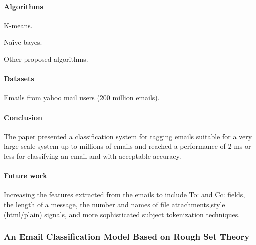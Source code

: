 \documentclass[12pt]{article}
\newenvironment{my_itemize}
{\begin{itemize}
  \setlength{\itemsep}{0cm}
  \setlength{\parskip}{0cm}}
{\end{itemize}}
\begin{document}
\paragraph{Algorithms}
\begin{my_itemize}
  \item K-means.
  \item Na\"{\i}ve bayes.
  \item Other proposed algorithms.
\end{my_itemize}

\paragraph{Datasets}
\begin{my_itemize}
  \item Emails from yahoo mail users (200 million emails).
\end{my_itemize}


\paragraph{Conclusion}
\begin{my_itemize}
  \item The paper presented a classification system for tagging emails suitable for a very 
	large scale system up to millions of emails and reached a performance of 2 ms or 
	less for classifying an email and with acceptable accuracy.
\end{my_itemize}

\paragraph{Future work}
\begin{my_itemize}
  \item Increasing the features extracted from the emails to include To: and Cc: fields,
	the length of a message, the number and names of file attachments,style (html/plain) signals, 
	and more sophisticated subject tokenization techniques.
\end{my_itemize}



\subsubsection{An Email Classification Model Based on Rough Set Theory \cite{WENQING05}}
\end{document}
